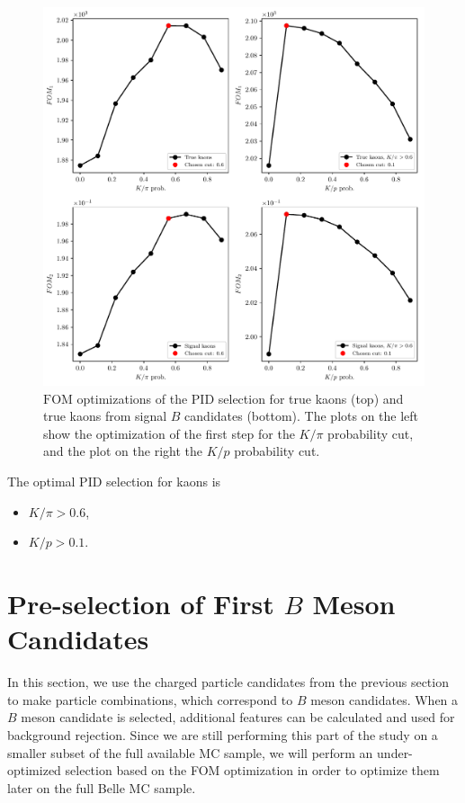 \begin{figure}[H]
	\centering
	\captionsetup{width=.8\linewidth}
	\includegraphics[width=\linewidth]{fig/FSP_kaon_fom}
	\caption{$\mathrm{FOM}$ optimizations of the PID selection for true kaons (top) and true kaons from signal $B$ candidates (bottom). The plots on the left show the optimization of the first step for the $K / \pi$ probability cut, and the plot on the right the $K/p$ probability cut.}
	\label{fig:Kfom}
\end{figure}

The optimal PID selection for kaons is
\begin{itemize}
	\item $K/\pi > 0.6$,
	\item $K/p > 0.1$.
\end{itemize}

\section{Pre-selection of First \texorpdfstring{$B$}{B} Meson Candidates}

In this section, we use the charged particle candidates from the previous section to make particle combinations, which correspond to $B$ meson candidates. When a $B$ meson candidate is selected, additional features can be calculated and used for background rejection. Since we are still performing this part of the study on a smaller subset of the full available MC sample, we will perform an under-optimized selection based on the FOM optimization in order to optimize them later on the full Belle MC sample.


